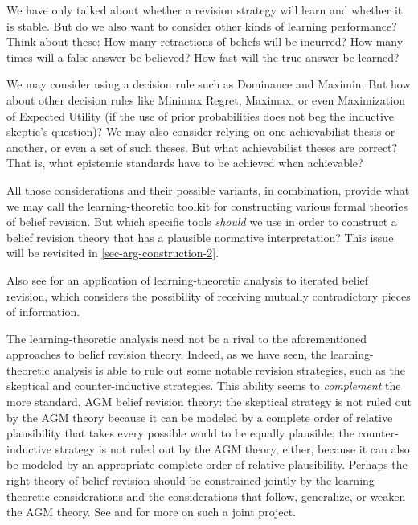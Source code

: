 	
		We have only talked about whether a revision strategy will learn and whether it is stable. But do we also want to consider other kinds of learning performance? Think about these: How many retractions of beliefs will be incurred? How many times will a false answer be believed? How fast will the true answer be learned?

	
		We may consider using a decision rule such as Dominance and Maximin. But how about other decision rules like Minimax Regret, Maximax, or even Maximization of Expected Utility (if the use of prior probabilities does not beg the inductive skeptic's question)? We may also consider relying on one achievabilist thesis or another, or even a set of such theses. But what achievabilist theses are correct? That is, what epistemic standards have to be achieved when achievable?

\ed All those considerations and their possible variants, in combination, provide what we may call the learning-theoretic toolkit for constructing various formal theories of belief revision. But which specific tools {\em should} we use in order to construct a belief revision theory that has a plausible normative interpretation? This issue will be revisited in \autoref{sec-arg-construction-2}.


Also see \citet{kelly1999iterated} for an application of learning-theoretic analysis to iterated belief revision, which considers the possibility of receiving mutually contradictory pieces of information.

The learning-theoretic analysis need not be a rival to the aforementioned approaches to belief revision theory. Indeed, as we have seen, the learning-theoretic analysis is able to rule out some notable revision strategies, such as the skeptical and counter-inductive strategies. This ability seems to {\em complement} the more standard, AGM belief revision theory: the skeptical strategy is not ruled out by the AGM theory because it can be modeled by a complete order of relative plausibility that takes every possible world to be equally plausible; the counter-inductive strategy is not ruled out by the AGM theory, either, because it can also be modeled by an appropriate complete order of relative plausibility. Perhaps the right theory of belief revision should be constrained jointly by the learning-theoretic considerations and the considerations that follow, generalize, or weaken the AGM theory. See \citet{baltag2016solvability} and \citet{genin2015theory} for more on such a joint project.


